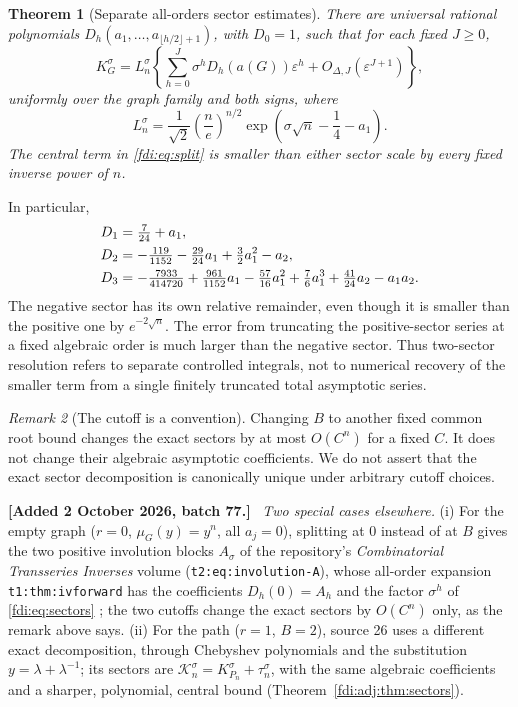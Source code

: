 \documentclass[11pt,letterpaper]{article}
\newtheorem{theorem}{Theorem}[section]
\theoremstyle{remark}\newtheorem{remark}[theorem]{Remark}
\newcommand{\eps}{\varepsilon}\newcommand{\Pois}{\operatorname{Poisson}}
\newenvironment{mergenote}[1][2 October 2026, batch 77]{\par\smallskip\begingroup\small\noindent\textbf{[Added #1.]}\ }{\endgroup\par\smallskip}
\begin{document}
\begin{theorem}[Separate all-orders sector estimates]\label{fdi:thm:sectors}
There are universal rational polynomials $D_h(a_1,\ldots,a_{\lfloor h/2\rfloor+1})$, with $D_0=1$, such that for each fixed $J\ge0$,
\begin{equation}\label{fdi:eq:sectors}
 K_G^\sigma=L_n^\sigma
 \left\{\sum_{h=0}^J\sigma^hD_h(a(G))\eps^h
 +O_{\Delta,J}(\eps^{J+1})\right\},
\end{equation}
uniformly over the graph family and both signs, where
\begin{equation}\label{fdi:eq:L}
 L_n^\sigma=\frac1{\sqrt2}\left(\frac ne\right)^{n/2}
 \exp\left(\sigma\sqrt n-\frac14-a_1\right).
\end{equation}
The central term in \eqref{fdi:eq:split} is smaller than either sector scale by every fixed inverse power of $n$.
\end{theorem}
In particular,
\begin{align}
 D_1&=\tfrac7{24}+a_1,\notag\\
 D_2&=-\tfrac{119}{1152}-\tfrac{29}{24}a_1+\tfrac32a_1^2-a_2,\label{fdi:eq:D123}\\
 D_3&=-\tfrac{7933}{414720}+\tfrac{961}{1152}a_1
 -\tfrac{57}{16}a_1^2+\tfrac76a_1^3+\tfrac{41}{24}a_2-a_1a_2.\notag
\end{align}
The negative sector has its own relative remainder, even though it is smaller than the positive one by $e^{-2\sqrt n}$. The error from truncating the positive-sector series at a fixed algebraic order is much larger than the negative sector. Thus two-sector resolution refers to separate controlled integrals, not to numerical recovery of the smaller term from a single finitely truncated total asymptotic series.

\begin{remark}[The cutoff is a convention]
Changing $B$ to another fixed common root bound changes the exact sectors by at most $O(C^n)$ for a fixed $C$. It does not change their algebraic asymptotic coefficients. We do not assert that the exact sector decomposition is canonically unique under arbitrary cutoff choices.
\end{remark}

\begin{mergenote}
\emph{Two special cases elsewhere.} (i) For the empty graph ($r=0$, $\mu_G(y)=y^n$, all $a_j=0$), splitting at $0$ instead of at $B$ gives the two positive involution blocks $A_\sigma$ of the repository's \emph{Combinatorial Transseries Inverses} volume (\texttt{t2:eq:involution-A}), whose all-order expansion \texttt{t1:thm:ivforward} has the coefficients $D_h(0)=A_h$ and the factor $\sigma^h$ of \eqref{fdi:eq:sectors} \cite{cti}; the two cutoffs change the exact sectors by $O(C^n)$ only, as the remark above says. (ii) For the path ($r=1$, $B=2$), source 26 uses a different exact decomposition, through Chebyshev polynomials and the substitution $y=\lambda+\lambda^{-1}$; its sectors are $\mathcal K_n^\sigma=K_{P_n}^\sigma+\tau_n^\sigma$, with the same algebraic coefficients and a sharper, polynomial, central bound (Theorem~\ref{fdi:adj:thm:sectors}).
\end{mergenote}
\end{document}

